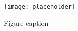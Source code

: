 \documentclass[11pt,fleqn]{book} %
\begin{document}
\begin{figure}[h]
\centering\texttt{[image: placeholder]}
\caption{Figure caption}
\end{figure}




\cleardoublepage
{}
\setlength{\columnsep}{0.75cm}
\printindex

\end{document}
